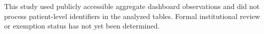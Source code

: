 This study used publicly accessible aggregate dashboard observations and did not process patient-level identifiers in the analyzed tables. Formal institutional review or exemption status has not yet been determined. 